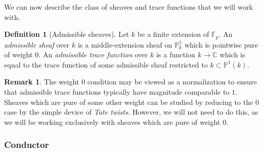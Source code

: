\documentclass[12pt,a4paper,reqno]{amsart}
\numberwithin{equation}{section}
\theoremstyle{plain}
\theoremstyle{definition}
\newtheorem{definition}[theorem]{Definition}
\newtheorem{remark}[theorem]{Remark}
\newcommand\F{\mathbb{F}}
\newcommand\Z{\mathbb{Z}}
\newcommand\C{\mathbb{C}}
\newcommand\Q{\mathbb{Q}}
\newcommand\ov{\overline}
\newcommand\mcF{\mathcal{F}}
\newcommand\Pl{\mathbb{P}^1}
\newcommand\Fp{\F_{p}}
\begin{document}

We can now describe the class of sheaves and trace functions that we
will work with.

\begin{definition}[Admissible sheaves] Let $k$ be a finite extension
  of $\Fp$. An \emph{admissible sheaf} over $k$ is a middle-extension
  sheaf on $\Pl_{k}$ which is pointwise pure of weight $0$.  An
  \emph{admissible trace function} over $k$ is a function
  $k\rightarrow \C$ which is equal to the trace function of some
  admissible sheaf restricted to $k\subset \Pl(k)$.
\end{definition}

\begin{remark} The weight $0$ condition may be viewed as a
  normalization to ensure that admissible trace functions typically
  have magnitude comparable to $1$.  Sheaves which are pure of some
  other weight can be studied by reducing to the $0$ case by the
  simple device of \emph{Tate twists}. However, we will not need to do
  this, as we will be working exclusively with sheaves which are pure
  of weight $0$.
\end{remark}

\subsubsection{Conductor}
\end{document}
